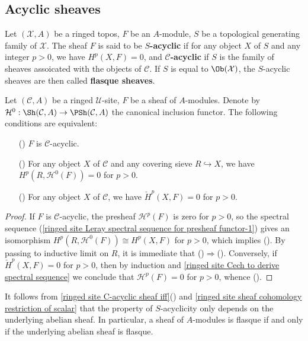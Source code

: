 \subsection{Acyclic sheaves}
Let $(\mathcal{X},A)$ be a ringed topos, $F$ be an $A$-module, $S$ be a topological generating family of $\mathcal{X}$. The sheaf $F$ is said to be \textbf{$S$-acyclic} if for any object $X$ of $S$ and any integer $p>0$, we have $H^p(X,F)=0$, and \textbf{$\mathcal{C}$-acyclic} if $S$ is the family of sheaves assoicated with the objects of $\mathcal{C}$. If $S$ is equal to $\Ob(\mathcal{X})$, the $S$-acyclic sheaves are then called \textbf{flasque sheaves}.
\begin{proposition}\label{ringed site C-acyclic sheaf iff}
Let $(\mathcal{C},A)$ be a ringed $\mathscr{U}$-site, $F$ be a sheaf of $A$-modules. Denote by $\mathcal{H}^0:\Sh(\mathcal{C},A)\to \PSh(\mathcal{C},A)$ the canonical inclusion functor. The following conditions are equivalent:
\begin{enumerate}
    \item[(\rmnum{1})] $F$ is $\mathcal{C}$-acyclic.
    \item[(\rmnum{2})] For any object $X$ of $\mathcal{C}$ and any covering sieve $R\hookrightarrow X$, we have $H^p(R,\mathcal{H}^0(F))=0$ for $p>0$.
    \item[(\rmnum{3})] For any object $X$ of $\mathcal{C}$, we have $\check{H}^p(X,F)=0$ for $p>0$.
\end{enumerate}
\end{proposition}
\begin{proof}
If $F$ is $\mathcal{C}$-acyclic, the presheaf $\mathcal{H}^p(F)$ is zero for $p>0$, so the spectral sequence (\ref{ringed site Leray spectral sequence for presheaf functor-1}) gives an isomorphism $H^p(R,\mathcal{H}^0(F))\cong H^p(X,F)$ for $p>0$, which implies (). By passing to inductive limit on $R$, it is immediate that ()$\Rightarrow$(). Conversely, if $\check{H}^p(X,F)=0$ for $p>0$, then by induction and \cref{ringed site Cech to derive spectral sequence} we conclude that $\mathcal{H}^p(F)=0$ for $p>0$, whence ().
\end{proof}

It follows from \cref{ringed site C-acyclic sheaf iff}() and \cref{ringed site sheaf cohomology restriction of scalar} that the property of $S$-acyclicity only depends on the underlying abelian sheaf. In particular, a sheaf of $A$-modules is flasque if and only if the underlying abelian sheaf is flasque.


